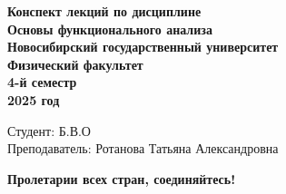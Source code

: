 \documentclass[12pt, a4paper,oneside]{book}
\begin{document}
\begin{titlepage}
    \thispagestyle{empty}  %
    \centering
    \vspace*{1cm}  %

    \textbf{\huge Конспект лекций по дисциплине}  \\[1.5cm]  %
    \textbf{\huge Основы функционального анализа}  \\[2cm]   %
    \textbf{\Large Новосибирский государственный университет} \\[0.5cm]
    \textbf{\large Физический факультет} \\[0.5cm]
    \textbf{\large 4-й семестр} \\[0.5cm]
    \textbf{\large 2025 год} \\[10cm]

    \begin{flushright}
        \large Студент: Б.В.О \\[0.5cm]  %
        Преподаватель: Ротанова Татьяна Александровна  %
    \end{flushright}
\end{titlepage}

\tableofcontents  %

\def\mainfile{}  %















\vfill
\begin{center}
    \textbf{Пролетарии всех стран, соединяйтесь!}
\end{center}
\vfil
\end{document}
